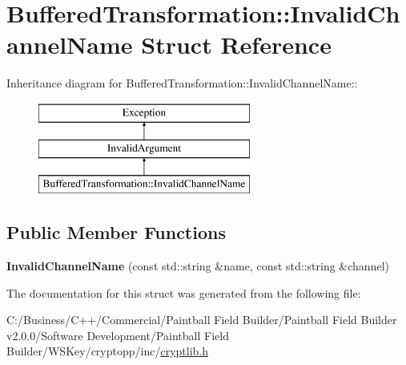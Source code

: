 \hypertarget{struct_buffered_transformation_1_1_invalid_channel_name}{
\section{BufferedTransformation::InvalidChannelName Struct Reference}
\label{struct_buffered_transformation_1_1_invalid_channel_name}
}
Inheritance diagram for BufferedTransformation::InvalidChannelName::\begin{figure}[H]
\begin{center}
\leavevmode
\includegraphics[height=3cm]{struct_buffered_transformation_1_1_invalid_channel_name}
\end{center}
\end{figure}
\subsection*{Public Member Functions}
\begin{DoxyCompactItemize}
\item 
\hypertarget{struct_buffered_transformation_1_1_invalid_channel_name_ae01d8c67c691434c05312edfd873d1fa}{
{\bfseries InvalidChannelName} (const std::string \&name, const std::string \&channel)}
\label{struct_buffered_transformation_1_1_invalid_channel_name_ae01d8c67c691434c05312edfd873d1fa}

\end{DoxyCompactItemize}


The documentation for this struct was generated from the following file:\begin{DoxyCompactItemize}
\item 
C:/Business/C++/Commercial/Paintball Field Builder/Paintball Field Builder v2.0.0/Software Development/Paintball Field Builder/WSKey/cryptopp/inc/\hyperlink{cryptlib_8h}{cryptlib.h}\end{DoxyCompactItemize}
